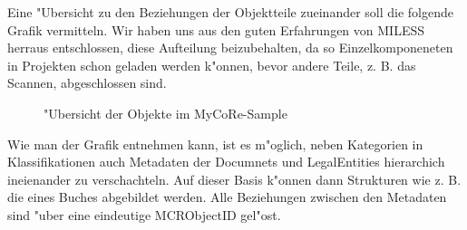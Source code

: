 Eine "Ubersicht zu den Beziehungen der Objektteile zueinander soll die folgende Grafik vermitteln. Wir haben uns aus den guten Erfahrungen von MILESS herraus entschlossen, diese Aufteilung beizubehalten, da so Einzelkomponeneten in Projekten schon geladen werden k"onnen, bevor andere Teile, z. B. das Scannen, abgeschlossen sind. \\
\begin{figure}[H]
\begin{center}
\caption{"Ubersicht der Objekte im MyCoRe-Sample}
\end{center}
\end{figure}
Wie man der Grafik entnehmen kann, ist es m"oglich, neben Kategorien in Klassifikationen auch Metadaten der Documnets und LegalEntities hierarchich ineienander zu verschachteln. Auf dieser Basis k"onnen dann Strukturen wie z. B. die eines Buches abgebildet werden. Alle Beziehungen zwischen den Metadaten sind "uber eine eindeutige MCRObjectID gel"ost. \\
